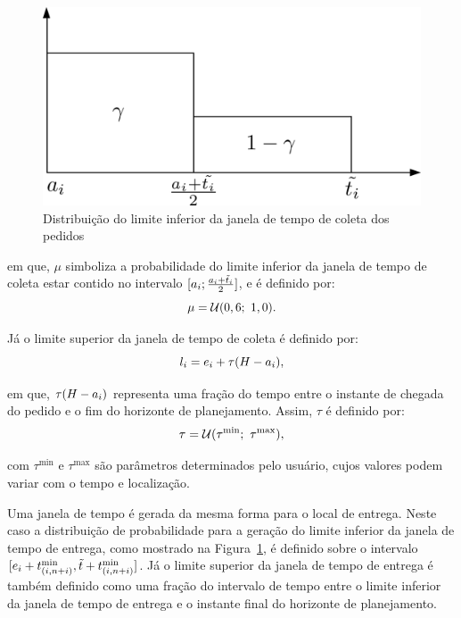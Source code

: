 \begin{figure}[h]
    \centering
    \includegraphics{fig/gendreau2006_distribution.png}
    \caption{Distribuição do limite inferior da janela de tempo de coleta dos
             pedidos \cite{gendreau_neighborhood_2006}}
    \label{fig:gendreau2006_distribution}
\end{figure}

\noindent em que, $\mu$ simboliza a probabilidade do limite inferior da janela 
de tempo de coleta estar contido no intervalo $[a_i; 
\frac{a_i + \Tilde{t}_i}{2}]$, e é definido por:
%
\begin{equation}
  \mu = \mathcal{U}(0,6;\ 1,0).
\end{equation}

Já o limite superior da janela de tempo de coleta é definido por:
%
\begin{equation}
    l_i = 
      e_i 
      + \tau(H - a_i),
\end{equation}

\noindent em que, $\tau(H - a_i)$ 
representa uma fração do tempo entre o instante de chegada do pedido e o fim 
do horizonte de planejamento. Assim, $\tau$ é definido por:
%
\begin{equation}
  \tau = \mathcal{U}(\tau^{\min};\ \tau^{\max}),
\end{equation}

\noindent com $\tau^{\min}$ e $\tau^{\max}$ são parâmetros determinados pelo 
usuário, cujos valores podem variar com o tempo e localização.

Uma janela de tempo é gerada da mesma forma para o local de entrega. 
Neste caso a distribuição de probabilidade para a geração do limite inferior 
da janela de tempo de entrega, como mostrado na 
Figura~\ref{fig:gendreau2006_distribution}, é definido sobre o intervalo
$[e_i 
+ t_{(i,n + i)}^{\min}, 
\Tilde{t} + t_{(i,n + i)}^{\min}]$.
Já o limite superior da janela de tempo de entrega é também definido como uma
fração do intervalo de tempo entre o limite inferior da janela de tempo de
entrega e o instante final do horizonte de planejamento.


